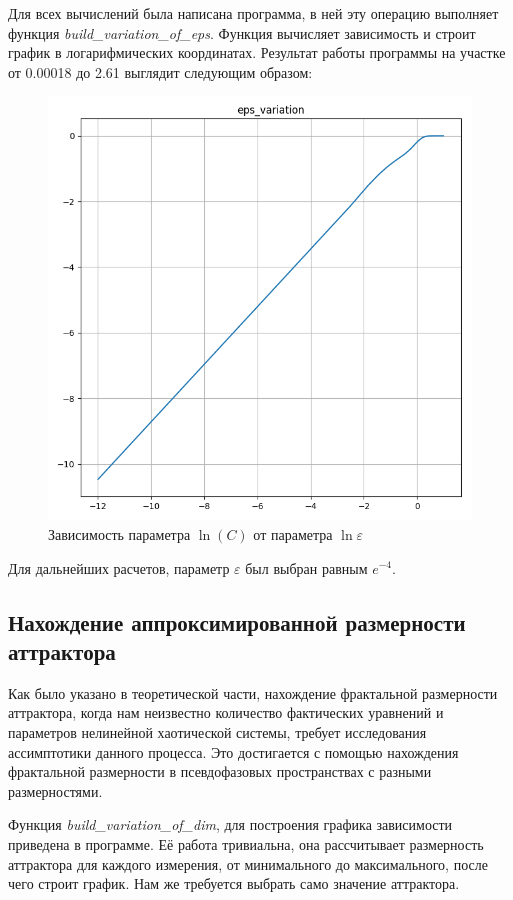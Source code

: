 \documentclass[12pt, oneside, a4paper]{article}
\begin{document}
Для всех вычислений была написана программа, в ней эту операцию выполняет 
функция \textit{build\_variation\_of\_eps}. 
Функция вычисляет зависимость и строит
график в логарифмических координатах. Результат работы программы на участке от 
0.00018 до 2.61 выглядит следующим образом: 
\begin{figure}[!h]
    \caption {Зависимость параметра $\ln(C)$ от параметра $\ln{\varepsilon}$ }
    \centerline{\includegraphics[scale = 0.72]{../results/lce.png}}
\end{figure}
\newpage
Для дальнейших расчетов, параметр $\varepsilon$ был выбран равным $e^{-4}$.
\subsection{Нахождение аппроксимированной размерности аттрактора}
Как было указано в теоретической части, нахождение фрактальной
размерности аттрактора, когда нам неизвестно количество фактических уравнений
и параметров нелинейной хаотической системы, требует исследования ассимптотики
данного процесса. Это достигается с помощью нахождения фрактальной размерности
в псевдофазовых пространствах с разными размерностями.

Функция \textit{build\_variation\_of\_dim}, для построения графика зависимости приведена в программе.
Её работа тривиальна, она рассчитывает 
размерность аттрактора для каждого измерения, от минимального до максимального,
после чего строит график. Нам же требуется выбрать само значение аттрактора.
\end{document}
